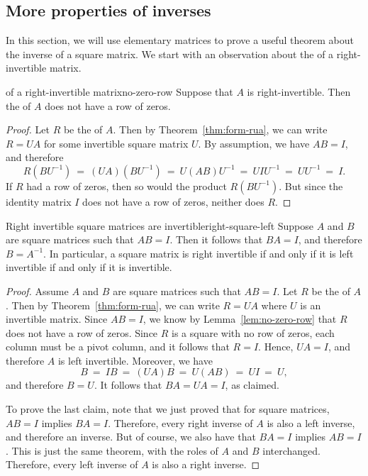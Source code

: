 \subsection{More properties of inverses}


In this section, we will use elementary matrices to prove a useful
theorem about the inverse of a square matrix. We start with an
observation about the {\ef} of a right-invertible matrix.

\begin{lemma}{{\Ef} of a right-invertible matrix}{no-zero-row}
  Suppose that $A$ is right-invertible. Then the {\rref} of $A$ does
  not have a row of zeros.
\end{lemma}

\begin{proof}
  Let $R$ be the {\rref} of $A$. Then by Theorem~\ref{thm:form-rua},
  we can write $R=UA$ for some invertible square matrix $U$. By
  assumption, we have $AB=I$, and therefore 
  \begin{equation*}
    R(BU^{-1})
    ~=~
    (UA)(BU^{-1})
    ~=~
    U(AB)U^{-1}
    ~=~
    UIU^{-1}
    ~=~
    UU^{-1}
    ~=~
    I.
  \end{equation*}
  If $R$ had a row of zeros, then so would the product
  $R(BU^{-1})$. But since the identity matrix $I$ does not have a row
  of zeros, neither does $R$.
\end{proof}

\begin{theorem}{Right invertible square matrices are invertible}{right-square-left}
  Suppose $A$ and $B$ are square matrices such that $AB=I$. Then it
  follows that $BA=I$, and therefore $B=A^{-1}$. In particular, a
  square matrix is right invertible if and only if it is left
  invertible if and only if it is invertible.
\end{theorem}

\begin{proof}
  Assume $A$ and $B$ are square matrices such that $AB=I$. Let $R$ be
  the {\rref} of $A$. Then by Theorem~\ref{thm:form-rua}, we can write
  $R=UA$ where $U$ is an invertible matrix. Since $AB=I$, we know by
  Lemma~\ref{lem:no-zero-row} that $R$ does not have a row of
  zeros. Since $R$ is a square {\rref} with no row of zeros, each
  column must be a pivot column, and it follows that $R=I$. Hence,
  $UA=I$, and therefore $A$ is left invertible. Moreover, we have
  \begin{equation*}
    B ~=~ IB ~=~ (UA)B ~=~ U(AB) ~=~ UI ~=~ U,
  \end{equation*}
  and therefore $B=U$. It follows that $BA=UA=I$, as claimed.

  To prove the last claim, note that we just proved that for square
  matrices, $AB=I$ implies $BA=I$. Therefore, every right inverse of
  $A$ is also a left inverse, and therefore an inverse. But of course,
  we also have that $BA=I$ implies $AB=I$. This is just the same
  theorem, with the roles of $A$ and $B$ interchanged. Therefore,
  every left inverse of $A$ is also a right inverse.  
\end{proof}

